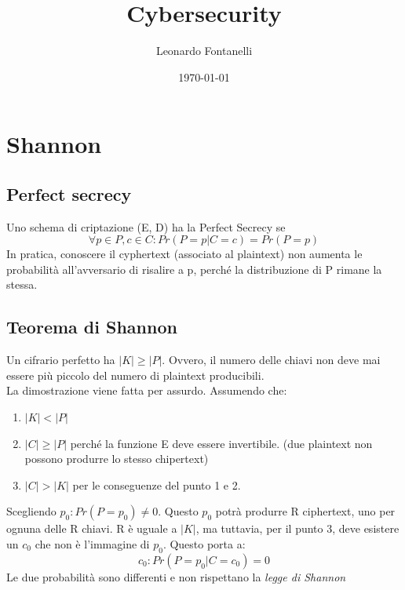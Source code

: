 \documentclass[a4paper,12pt]{article}
\title{Cybersecurity}
\author{Leonardo Fontanelli}
\date{\monthyeardate\today}
\begin{document}

\maketitle
{}

\tableofcontents

\newpage


\section{Shannon}
\subsection{Perfect secrecy}
Uno schema di criptazione (E, D) ha la Perfect Secrecy se
$$ \forall p \in P, c \in C : Pr(P = p | C = c) = Pr(P = p) $$
In pratica, conoscere il cyphertext (associato al plaintext) non aumenta le probabilità all'avversario di risalire a p, perché la distribuzione di P rimane la stessa.
\subsection{Teorema di Shannon}
Un cifrario perfetto ha $ |K| \geq |P| $.
Ovvero, il numero delle chiavi non deve mai essere più piccolo del numero di plaintext producibili. \\
La dimostrazione viene fatta per assurdo. Assumendo che:
\begin{enumerate}
	\item $|K| < |P|$
	\item $|C| \geq |P|$ perché la funzione E deve essere invertibile. (due plaintext non possono produrre lo stesso chipertext)
	\item $|C| > |K|$ per le conseguenze del punto 1 e 2.
\end{enumerate}
Scegliendo $p_0 : Pr(P = p_0) \neq 0$. Questo $p_0$ potrà produrre R ciphertext, uno per ognuna delle R chiavi.
R è uguale a $|K|$, ma tuttavia, per il punto 3, deve esistere un $c_0$ che non è l'immagine di $p_0$. 
Questo porta a:
$$ c_0 : Pr(P = p_0 | C = c_0) = 0 $$ 
Le due probabilità sono differenti e non rispettano la \textit{legge di Shannon}
\end{document}
